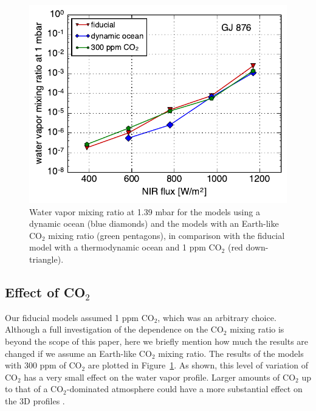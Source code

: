 \documentclass[11pt,numberedappendix,twocolappendix,]{emulateapj}
\def\wv{water vapor}
\begin{document}
\begin{figure}[!h]
    \begin{center}
    \includegraphics[width=0.9\hsize]{xH2O_sensitivity.pdf}
    \end{center}
\caption{Water vapor mixing ratio at 1.39 mbar for the models using a dynamic ocean (blue diamonds) and the models with an Earth-like CO$_2$ mixing ratio (green pentagons), in comparison with the fiducial model with a thermodynamic ocean and 1 ppm CO$_2$ (red down-triangle). }
\label{fig:change_ocean}
\end{figure}

\subsection{Effect of CO$_2$}
\label{ss:sensitivity_ocean}

Our fiducial models assumed 1 ppm CO$_2$, which was an arbitrary choice. 
Although a full investigation of the dependence on the CO$_2$ mixing ratio is beyond the scope of this paper, here we briefly mention how much the results are changed if we assume an Earth-like CO$_2$ mixing ratio. 
The results of the models with 300 ppm of CO$_2$ are plotted in Figure~\ref{fig:change_ocean}. 
As shown, this level of variation of CO$_2$ has a very small effect on the \wv{} profile. 
Larger amounts of CO$_2$ up to that of a CO$_2$-dominated atmosphere could have a more substantial effect on the 3D profiles \citep{Wordsworth2013}. 


\end{document}
